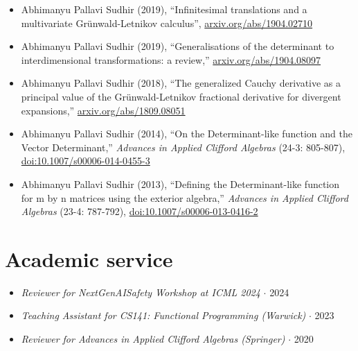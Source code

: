 \documentclass{article}
\begin{document}
\begin{itemize}

    \item
          Abhimanyu Pallavi Sudhir (2019),
          ``Infinitesimal translations and a multivariate Gr\"unwald-Letnikov calculus'', \href{https://arxiv.org/abs/1904.02710}{arxiv.org/abs/1904.02710}

    \item
          Abhimanyu Pallavi Sudhir (2019),
          ``Generalisations of the determinant to interdimensional transformations: a review,'' \href{https://arxiv.org/abs/1904.08097}{arxiv.org/abs/1904.08097}

    \item
          Abhimanyu Pallavi Sudhir (2018),
          ``The generalized Cauchy derivative as a principal value of the Gr\"unwald-Letnikov fractional derivative for divergent expansions,'' \href{https://arxiv.org/abs/1809.08051}{arxiv.org/abs/1809.08051}

    \item
          Abhimanyu Pallavi Sudhir (2014),
          ``On the Determinant-like function and the Vector Determinant,''
          \emph{Advances in Applied Clifford Algebras} (24-3: 805-807), \href{https://link.springer.com/article/10.1007/s00006-014-0455-3}{doi:10.1007/s00006-014-0455-3}

    \item
          Abhimanyu Pallavi Sudhir (2013),
          ``Defining the Determinant-like function for m by n matrices using the exterior algebra,''
          \emph{Advances in Applied Clifford Algebras} (23-4: 787-792),
          \href{https://link.springer.com/article/10.1007/s00006-013-0416-2}{doi:10.1007/s00006-013-0416-2}

\end{itemize}

\section*{Academic service}

\begin{itemize}

    \item \emph{Reviewer for NextGenAISafety Workshop at ICML 2024} $\cdot$ 2024

    \item \emph{Teaching Assistant for CS141: Functional Programming (Warwick)} $\cdot$ 2023

    \item \emph{Reviewer for Advances in Applied Clifford Algebras (Springer)} $\cdot$ 2020

\end{itemize}
\end{document}
